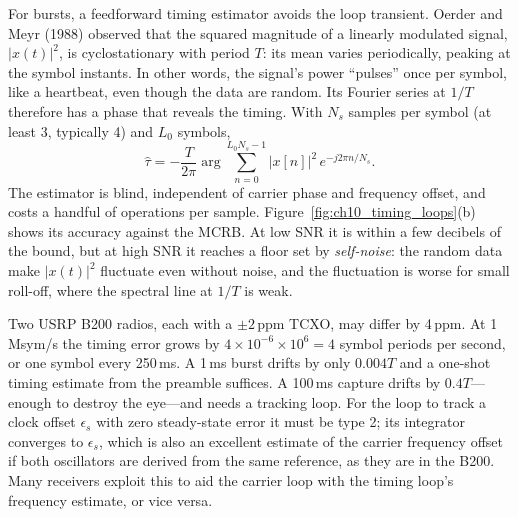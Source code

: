 For bursts, a feedforward timing estimator avoids the loop transient. Oerder and Meyr (1988) observed
that the squared magnitude of a linearly modulated signal, $|x(t)|^2$, is cyclostationary with period
$T$: its mean varies periodically, peaking at the symbol instants. In other words, the signal's
power ``pulses'' once per symbol, like a heartbeat, even though the data are random. Its Fourier
series at $1/T$ therefore has a phase that reveals the timing. With $N_s$ samples per symbol (at
least 3, typically 4) and $L_0$ symbols,
\begin{equation}
\hat\tau=-\frac{T}{2\pi}\arg\sum_{n=0}^{L_0N_s-1}|x[n]|^2\,e^{-j2\pi n/N_s}.
\end{equation}
The estimator is blind, independent of carrier phase and frequency offset, and costs a handful of
operations per sample. Figure~\ref{fig:ch10_timing_loops}(b) shows its accuracy against the MCRB. At
low SNR it is within a few decibels of the bound, but at high SNR it reaches a floor set by
\emph{self-noise}: the random data make $|x(t)|^2$ fluctuate even without noise, and the fluctuation is
worse for small roll-off, where the spectral line at $1/T$ is weak.


\begin{worked}
Two USRP B200 radios, each with a $\pm2$\,ppm TCXO, may differ by 4\,ppm. At 1\,Msym/s the timing error
grows by $4\times10^{-6}\times10^6=4$ symbol periods per second, or one symbol every 250\,ms. A 1\,ms burst
drifts by only $0.004T$ and a one-shot timing estimate from the preamble suffices. A 100\,ms capture
drifts by $0.4T$---enough to destroy the eye---and needs a tracking loop. For the loop to track a clock
offset $\epsilon_s$ with zero steady-state error it must be type 2; its integrator converges to
$\epsilon_s$, which is also an excellent estimate of the carrier frequency offset if both oscillators
are derived from the same reference, as they are in the B200. Many receivers exploit this to aid the
carrier loop with the timing loop's frequency estimate, or vice versa.
\end{worked}

